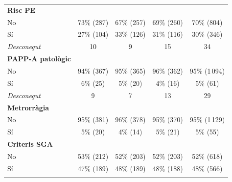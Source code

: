 \documentclass[../main.tex]{subfiles}
\begin{document}
\begin{scriptsize}
\begin{longtable}{lcccc}
          \addlinespace
          \textbf{Risc PE}     &                &                  &                   &               \\
          \hspace{1em}No        & 73\% (287)     & 67\% (257)       & 69\% (260)        & 70\% (804)    \\
          \hspace{1em}Sí        & 27\% (104)     & 33\% (126)       & 31\% (116)        & 30\% (346)    \\
          \hspace{1em}\textit{Desconegut}   & 10             & 9                & 15                & 34            \\
          \addlinespace
          \textbf{PAPP-A patològic} &                &                  &                   &               \\
          \hspace{1em}No        & 94\% (367)     & 95\% (365)       & 96\% (362)        & 95\% (1\,094) \\
          \hspace{1em}Sí        & 6\% (25)       & 5\% (20)         & 4\% (16)          & 5\% (61)      \\
          \hspace{1em}\textit{Desconegut}   & 9              & 7                & 13                & 29            \\
          \addlinespace
          \textbf{Metrorràgia}  &                &                  &                   &               \\
          \hspace{1em}No        & 95\% (381)     & 96\% (378)       & 95\% (370)        & 95\% (1\,129) \\
          \hspace{1em}Sí        & 5\% (20)       & 4\% (14)         & 5\% (21)          & 5\% (55)      \\
          \addlinespace
          \textbf{Criteris SGA} &              &                  &                   &               \\
          \hspace{1em}No        & 53\% (212)     & 52\% (203)       & 52\% (203)        & 52\% (618)    \\
          \hspace{1em}Sí        & 47\% (189)     & 48\% (189)       & 48\% (188)        & 48\% (566)    \\
          \addlinespace

\end{longtable}
\end{scriptsize}
\end{document}
